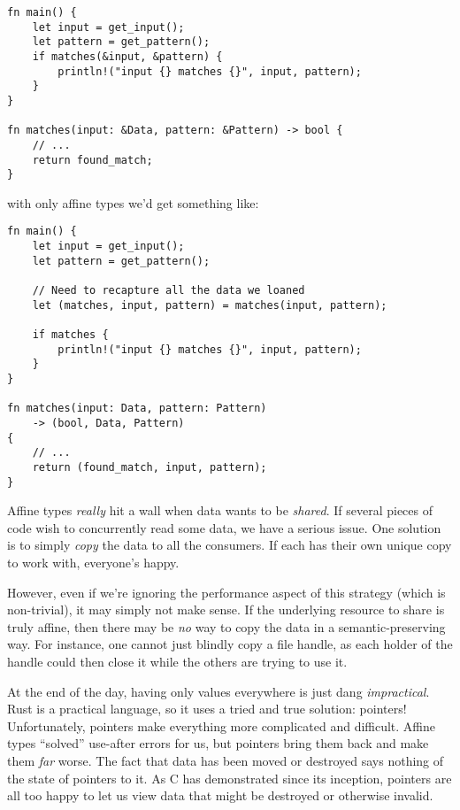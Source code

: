 \begin{verbatim}
fn main() {
    let input = get_input();
    let pattern = get_pattern();
    if matches(&input, &pattern) {
        println!("input {} matches {}", input, pattern);
    }
}

fn matches(input: &Data, pattern: &Pattern) -> bool {
    // ...
    return found_match;
}
\end{verbatim}

with only affine types we'd get something like:

\begin{verbatim}
fn main() {
    let input = get_input();
    let pattern = get_pattern();

    // Need to recapture all the data we loaned
    let (matches, input, pattern) = matches(input, pattern);

    if matches {
        println!("input {} matches {}", input, pattern);
    }
}

fn matches(input: Data, pattern: Pattern)
    -> (bool, Data, Pattern)
{
    // ...
    return (found_match, input, pattern);
}
\end{verbatim}

Affine types \emph{really} hit a wall when data wants to be \emph{shared}. If
several pieces of code wish to concurrently read some data, we have a serious
issue. One solution is to simply \emph{copy} the data to all the consumers. If each
has their own unique copy to work with, everyone's happy.

However, even if we're ignoring the performance aspect of this strategy (which
is non-trivial), it may simply not make sense. If the underlying resource to
share is truly affine, then there may be \emph{no} way to copy the data in a
semantic-preserving way. For instance, one cannot just blindly copy a file
handle, as each holder of the handle could then close it while the others are
trying to use it.

At the end of the day, having only values everywhere is just dang \emph{impractical}.
Rust is a practical language, so it uses a tried and true solution: pointers! Unfortunately,
pointers make everything more complicated and difficult. Affine types ``solved''
use-after errors for us, but pointers bring them back and make them \emph{far} worse.
The fact that data has been moved or destroyed says nothing of the state of
pointers to it. As C has demonstrated since its inception, pointers are all too
happy to let us view data that might be destroyed or otherwise invalid.

